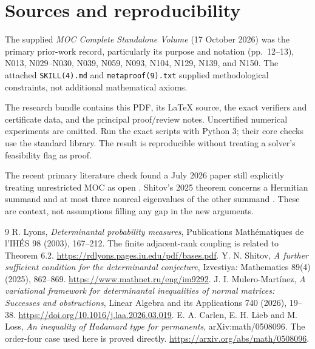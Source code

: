 \documentclass[11pt]{article}
\begin{document}
\section{Sources and reproducibility}
The supplied \emph{MOC Complete Standalone Volume} (17 October 2026) was the primary prior-work record, particularly its purpose and notation (pp.~12--13), N013, N029--N030, N039, N059, N093, N104, N129, N139, and N150. The attached \texttt{SKILL(4).md} and \texttt{metaproof(9).txt} supplied methodological constraints, not additional mathematical axioms.

The research bundle contains this PDF, its LaTeX source, the exact verifiers and certificate data, and the principal proof/review notes. Uncertified numerical experiments are omitted. Run the exact scripts with Python 3; their core checks use the standard library. The result is reproducible without treating a solver's feasibility flag as proof.

The recent primary literature check found a July 2026 paper still explicitly treating unrestricted MOC as open \cite{mulero}. Shitov's 2025 theorem concerns a Hermitian summand and at most three nonreal eigenvalues of the other summand \cite{shitov}. These are context, not assumptions filling any gap in the new arguments.

\begin{thebibliography}{9}
 R. Lyons, \emph{Determinantal probability measures}, Publications Math\'ematiques de l'IH\'ES 98 (2003), 167--212. The finite adjacent-rank coupling is related to Theorem 6.2. \url{https://rdlyons.pages.iu.edu/pdf/bases.pdf}.
 Y. N. Shitov, \emph{A further sufficient condition for the determinantal conjecture}, Izvestiya: Mathematics 89(4) (2025), 862--869. \url{https://www.mathnet.ru/eng/im9292}.
 J. I. Mulero-Mart\'inez, \emph{A variational framework for determinantal inequalities of normal matrices: Successes and obstructions}, Linear Algebra and its Applications 740 (2026), 19--38. \url{https://doi.org/10.1016/j.laa.2026.03.019}.
 E. A. Carlen, E. H. Lieb and M. Loss, \emph{An inequality of Hadamard type for permanents}, arXiv:math/0508096. The order-four case used here is proved directly. \url{https://arxiv.org/abs/math/0508096}.
\end{thebibliography}
\end{document}

